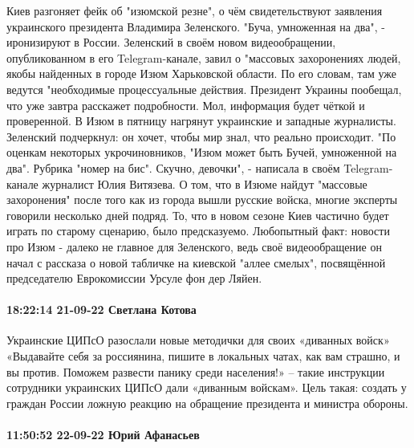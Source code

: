 Киев разгоняет фейк об "изюмской резне", о чём свидетельствуют заявления украинского президента Владимира Зеленского. "Буча, умноженная на два", - иронизируют в России.
Зеленский в своём новом видеообращении, опубликованном в его Telegram-канале, завил о "массовых захоронениях людей, якобы найденных в городе Изюм Харьковской области. По его словам, там уже ведутся "необходимые процессуальные действия.
Президент Украины пообещал, что уже завтра расскажет подробности. Мол, информация будет чёткой и проверенной. В Изюм в пятницу нагрянут украинские и западные журналисты. Зеленский подчеркнул: он хочет, чтобы мир знал, что реально происходит.
"По оценкам некоторых укрочиновников, "Изюм может быть Бучей, умноженной на два". Рубрика "номер на бис". Скучно, девочки", - написала в своём Telegram-канале журналист Юлия Витязева.
О том, что в Изюме найдут "массовые захоронения" после того как из города вышли русские войска, многие эксперты говорили несколько дней подряд. То, что в новом сезоне Киев частично будет играть по старому сценарию, было предсказуемо.
Любопытный факт: новости про Изюм - далеко не главное для Зеленского, ведь своё видеообращение он начал с рассказа о новой табличке на киевской "аллее смелых", посвящённой председателю Еврокомиссии Урсуле фон дер Ляйен.

\paragraph{18:22:14 21-09-22 Светлана Котова}

Украинские ЦИПсО разослали новые методички для своих «диванных войск»
«Выдавайте себя за россиянина, пишите в локальных чатах, как вам страшно, и вы против. Поможем развести панику среди населения!» – такие инструкции сотрудники украинских ЦИПсО дали «диванным войскам». Цель такая: создать у граждан России ложную реакцию на обращение президента и министра обороны.

\paragraph{11:50:52 22-09-22 Юрий Афанасьев}

